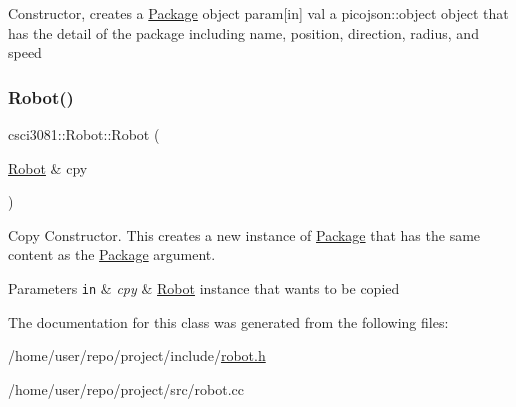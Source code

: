 Constructor, creates a \hyperlink{classcsci3081_1_1Package}{Package} object param\mbox{[}in\mbox{]} val a picojson\+::object object that has the detail of the package including name, position, direction, radius, and speed \mbox{\label{classcsci3081_1_1Robot_ae87d6490b70cce02a195794a3bb65b69}} 
\subsubsection{\texorpdfstring{Robot()}{Robot()}\hspace{0.1cm}{\footnotesize\ttfamily [2/2]}}
{\footnotesize\ttfamily csci3081\+::\+Robot\+::\+Robot (\begin{DoxyParamCaption}\item[{\hyperlink{classcsci3081_1_1Robot}{Robot} \&}]{cpy }\end{DoxyParamCaption})}



Copy Constructor. This creates a new instance of \hyperlink{classcsci3081_1_1Package}{Package} that has the same content as the \hyperlink{classcsci3081_1_1Package}{Package} argument. 


\begin{DoxyParams}[1]{Parameters}
\mbox{\tt in}  & {\em cpy} & \hyperlink{classcsci3081_1_1Robot}{Robot} instance that wants to be copied \\
\hline
\end{DoxyParams}


The documentation for this class was generated from the following files\+:\begin{DoxyCompactItemize}
\item 
/home/user/repo/project/include/\hyperlink{robot_8h}{robot.\+h}\item 
/home/user/repo/project/src/robot.\+cc\end{DoxyCompactItemize}
